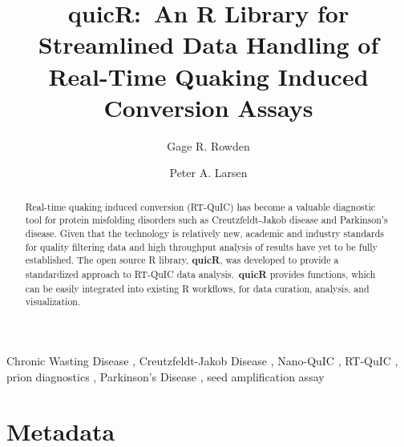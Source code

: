 \documentclass[preprint,12pt,a4paper]{elsarticle}
\begin{document}
    \renewcommand{\labelenumii}{\arabic{enumi}.\arabic{enumii}}

    \begin{frontmatter}

        \title{\textbf{quicR}:\ An R Library for Streamlined Data Handling of Real-Time Quaking Induced Conversion Assays}
        \author[label1,label2,label3]{Gage R. Rowden}
        \author[label1,label2,label3]{Peter A. Larsen}
        \address[label1]{Department of Veterinary and Biomedical Sciences, University of Minnesota, USA.}
        \address[label2]{Minnesota Center for Prion Research and Outreach, University of Minnesota, USA.}
        \address[label3]{Priogen Corp., USA.}

        \begin{abstract}
            Real-time quaking induced conversion (RT-QuIC) has become a valuable diagnostic tool for protein misfolding disorders such as Creutzfeldt-Jakob disease and Parkinson's disease. Given that the technology is relatively new, academic and industry standards for quality filtering data and high throughput analysis of results have yet to be fully established. The open source R library, \textbf{quicR}, was developed to provide a standardized approach to RT-QuIC data analysis.\ \textbf{quicR} provides functions, which can be easily integrated into existing R workflows, for data curation, analysis, and visualization.
        \end{abstract}

        \begin{keyword}
            Chronic Wasting Disease \sep{} Creutzfeldt-Jakob Disease \sep{} Nano-QuIC \sep{} RT-QuIC \sep{} prion diagnostics \sep{} Parkinson's Disease \sep{} seed amplification assay
        \end{keyword}

    \end{frontmatter}

    \linenumbers

    \section*{Metadata}
\end{document}
